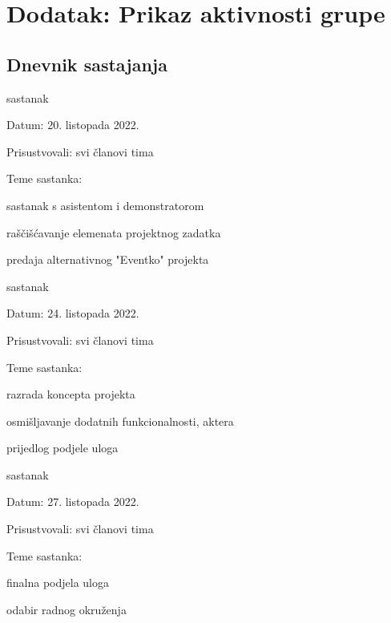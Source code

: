 \chapter*{Dodatak: Prikaz aktivnosti grupe}
		
		\section*{Dnevnik sastajanja}
		
		\begin{packed_enum}
			\item  sastanak
			
			\item[] \begin{packed_item}
				\item Datum: 20. listopada 2022.
				\item Prisustvovali: svi članovi tima
				\item Teme sastanka:
				\begin{packed_item}
					\item  sastanak s asistentom i demonstratorom
					\item  raščišćavanje elemenata projektnog zadatka
					\item  predaja alternativnog "Eventko" projekta
				\end{packed_item}
			\end{packed_item}
			
			\item  sastanak
			\item[] \begin{packed_item}
				\item Datum: 24. listopada 2022.
				\item Prisustvovali: svi članovi tima
				\item Teme sastanka:
				\begin{packed_item}
					\item  razrada koncepta projekta
					\item  osmišljavanje dodatnih funkcionalnosti, aktera
					\item  prijedlog podjele uloga
				\end{packed_item}
			\end{packed_item}
		
			\item  sastanak
			\item[] \begin{packed_item}
				\item Datum: 27. listopada 2022.
				\item Prisustvovali: svi članovi tima
				\item Teme sastanka:
				\begin{packed_item}
					\item  finalna podjela uloga
					\item  odabir radnog okruženja
				\end{packed_item}
			\end{packed_item}
		

\end{packed_enum}
